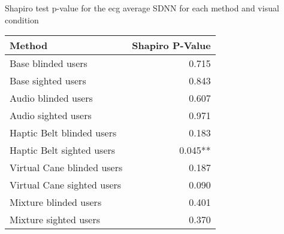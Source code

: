 
\centering
\caption{Shapiro test p-value for the ecg average SDNN for each method and visual condition}
\label{tab:shapiro_ecg_sdnn}
\begin{tabular}{lr}
\toprule
                    Method & Shapiro P-Value \\
\midrule
        Base blinded users &           0.715 \\
        Base sighted users &           0.843 \\
       Audio blinded users &           0.607 \\
       Audio sighted users &           0.971 \\
 Haptic Belt blinded users &           0.183 \\
 Haptic Belt sighted users &         0.045** \\
Virtual Cane blinded users &           0.187 \\
Virtual Cane sighted users &           0.090 \\
     Mixture blinded users &           0.401 \\
     Mixture sighted users &           0.370 \\
\bottomrule
\end{tabular}
